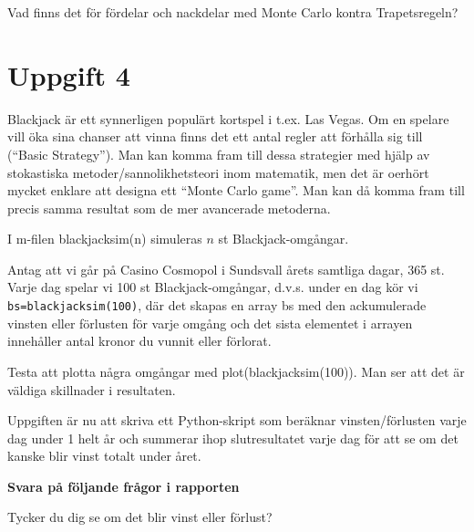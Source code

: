 \documentclass[a4paper]{article}
\begin{document}
Vad finns det för fördelar och nackdelar med Monte Carlo kontra Trapetsregeln?

\newpage
\section{Uppgift 4}

Blackjack är ett synnerligen populärt kortspel i t.ex. Las Vegas.
Om en spelare vill öka sina chanser att vinna finns det ett antal regler att
förhålla sig till (``Basic Strategy''). Man kan komma fram till dessa strategier
med hjälp av stokastiska metoder/sannolikhetsteori inom matematik, men det är oerhört
mycket enklare att designa ett ``Monte Carlo game''. Man kan då komma fram till precis
samma resultat som de mer avancerade metoderna.

I m-filen blackjacksim(n) simuleras \(n\) st Blackjack-omgångar.

Antag att vi går på Casino Cosmopol i Sundsvall årets samtliga dagar, 365 st.
Varje dag spelar vi 100 st Blackjack-omgångar, d.v.s. under en dag kör vi \lstinline{bs=blackjacksim(100)},
där det skapas en array bs med den ackumulerade vinsten eller förlusten för varje omgång
och det sista elementet i arrayen innehåller antal kronor du vunnit eller förlorat.

Testa att plotta några omgångar med plot(blackjacksim(100)). Man ser att det är väldiga skillnader i resultaten.

Uppgiften är nu att skriva ett Python-skript som beräknar vinsten/förlusten varje dag under 1
helt år och summerar ihop slutresultatet varje dag för att se om det kanske blir vinst totalt under året.

\textbf{Svara på följande frågor i rapporten}

Tycker du dig se om det blir vinst eller förlust?
\end{document}
